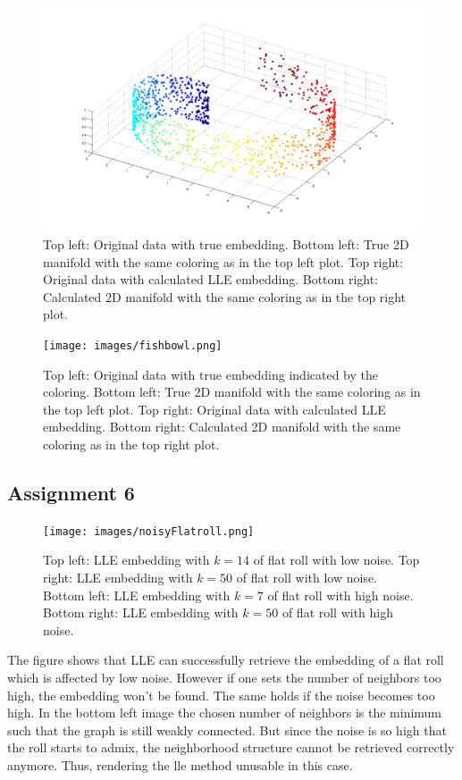 \documentclass[a4paper, 12pt, titlepage]{article}
\begin{document}
\begin{figure}[H]
	\centering
	\includegraphics[width=17cm]{images/swissroll.png}
	\caption{Top left: Original data with true embedding.
	Bottom left: True 2D manifold with the same coloring as in the top left plot.
	Top right: Original data with calculated LLE embedding.
	Bottom right: Calculated 2D manifold with the same coloring as in the top right plot.}
\end{figure}

\begin{figure}[H]
	\centering
	\texttt{[image: images/fishbowl.png]}
	\caption{Top left: Original data with true embedding indicated by the coloring.
	Bottom left: True 2D manifold with the same coloring as in the top left plot.
	Top right: Original data with calculated LLE embedding.
	Bottom right: Calculated 2D manifold with the same coloring as in the top right plot.}
\end{figure}

\subsection*{Assignment 6}

\begin{figure}[H]
	\centering
	\texttt{[image: images/noisyFlatroll.png]}
	\caption{Top left: LLE embedding with $k=14$ of flat roll with low noise.
	Top right: LLE embedding with $k=50$ of flat roll with low noise.
	Bottom left: LLE embedding with $k=7$ of flat roll with high noise.
	Bottom right: LLE embedding with $k=50$ of flat roll with high noise.}
\end{figure}

The figure shows that LLE can successfully retrieve the embedding of a flat roll which is affected by low noise.
However if one sets the number of neighbors too high, the embedding won't be found.
The same holds if the noise becomes too high.
In the bottom left image the chosen number of neighbors is the minimum such that the graph is still weakly connected.
But since the noise is so high that the roll starts to admix, the neighborhood structure cannot be retrieved correctly anymore.
Thus, rendering the lle method unusable in this case. 
\end{document}
